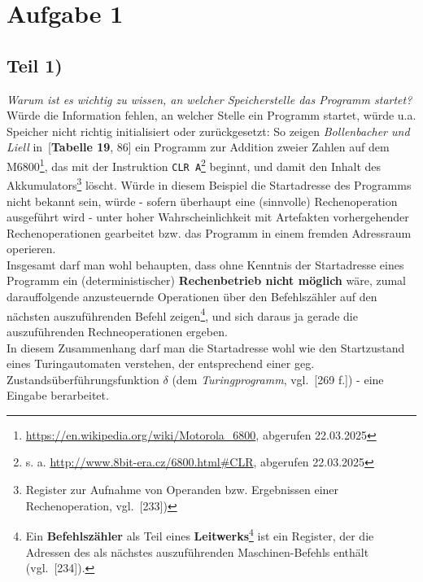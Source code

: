 \chapter{Aufgabe 1}

\section{Teil 1)}

\textit{Warum ist es wichtig zu wissen, an welcher Speicherstelle das Programm startet?}\\

\noindent
Würde die Information fehlen, an welcher Stelle ein Programm startet,  würde u.a. Speicher nicht richtig initialisiert oder zurückgesetzt: So zeigen \textit{Bollenbacher und Liell} in~\cite{BL21}[\textbf{Tabelle 19}, 86] ein Programm zur Addition zweier Zahlen auf dem M6800\footnote{
\url{https://en.wikipedia.org/wiki/Motorola_6800}, abgerufen 22.03.2025
}, das mit der Instruktion \texttt{CLR A}\footnote{
s. a. \url{http://www.8bit-era.cz/6800.html#CLR}, abgerufen 22.03.2025
} beginnt, und damit den Inhalt des  Akkumulators\footnote{
Register zur Aufnahme von Operanden bzw. Ergebnissen einer Rechenoperation, vgl.~\cite{Fri21}[233])
} löscht.
Würde in diesem Beispiel die Startadresse des Programms nicht bekannt sein, würde - sofern überhaupt eine (sinnvolle) Rechenoperation ausgeführt wird - unter hoher Wahrscheinlichkeit mit Artefakten vorhergehender Rechenoperationen gearbeitet bzw. das Programm in einem fremden Adressraum operieren.\\

\noindent
Insgesamt darf man wohl behaupten, dass ohne Kenntnis der Startadresse eines Programm ein (deterministischer) \textbf{Rechenbetrieb nicht möglich} wäre, zumal darauffolgende anzusteuernde Operationen über den Befehlszähler auf den nächsten auszuführenden Befehl zeigen\footnote{
Ein \textbf{Befehlszähler} als Teil eines \textbf{Leitwerks}\footnote{
    hier insb. bei der Von-Neumann-Rechnerarchitektur
} ist ein Register, der die Adressen des als nächstes auszuführenden Maschinen-Befehls enthält (vgl.~\cite{Fri21}[234]).
}, und sich daraus ja gerade die auszuführenden Rechneoperationen ergeben.\\

\noindent
In diesem Zusammenhang darf man die Startadresse wohl wie den Startzustand eines Turingautomaten verstehen, der entsprechend einer geg. Zustandsüberführungsfunktion $\delta$ (dem \textit{Turingprogramm}, vgl.~\cite{VW16h}[269 f.]) - eine Eingabe berarbeitet.

